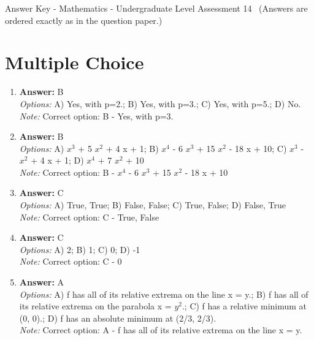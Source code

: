 \documentclass[12pt]{article}
\begin{document}
\begin{center}
Answer Key - Mathematics - Undergraduate Level Assessment 14 \
\small (Answers are ordered exactly as in the question paper.)
\end{center}

\section*{Multiple Choice}
\begin{enumerate}[label=\arabic*.]
\item \textbf{Answer:} B
\\ \textit{Options:} A) Yes, with p=2.; B) Yes, with p=3.; C) Yes, with p=5.; D) No.
\\ \textit{Note:} Correct option: B - Yes, with p=3.
\item \textbf{Answer:} B
\\ \textit{Options:} A) $x^3$ + 5 $x^2$ + 4 x + 1; B) $x^4$ - 6 $x^3$ + 15 $x^2$ - 18 x + 10; C) $x^3$ - $x^2$ + 4 x + 1; D) $x^4$ + 7 $x^2$ + 10
\\ \textit{Note:} Correct option: B - $x^4$ - 6 $x^3$ + 15 $x^2$ - 18 x + 10
\item \textbf{Answer:} C
\\ \textit{Options:} A) True, True; B) False, False; C) True, False; D) False, True
\\ \textit{Note:} Correct option: C - True, False
\item \textbf{Answer:} C
\\ \textit{Options:} A) 2; B) 1; C) 0; D) -1
\\ \textit{Note:} Correct option: C - 0
\item \textbf{Answer:} A
\\ \textit{Options:} A) f has all of its relative extrema on the line x = y.; B) f has all of its relative extrema on the parabola x = $y^2$.; C) f has a relative minimum at (0, 0).; D) f has an absolute minimum at (2/3, 2/3).
\\ \textit{Note:} Correct option: A - f has all of its relative extrema on the line x = y.
\end{enumerate}
\end{document}
